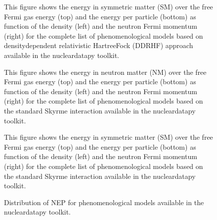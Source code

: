 \documentclass[letterpaper,10pt,english]{sphinxmanual}
\begin{document}
\begin{figure}[htbp]
\centering
\capstart

\noindent{}
\caption{This figure shows the energy in symmetric matter (SM) over the free Fermi gas energy (top) and the energy per particle (bottom) as function of the density (left) and the neutron Fermi momentum (right) for the complete list of phenomenological models based on density\sphinxhyphen{}dependent relativistic Hartree\sphinxhyphen{}Fock (DDRHF) approach available in the nucleardatapy toolkit.}\label{\detokenize{source/api/setup_eos_pheno:id6}}\end{figure}

\begin{figure}[htbp]
\centering
\capstart

\noindent{}
\caption{This figure shows the energy in neutron matter (NM) over the free Fermi gas energy (top) and the energy per particle (bottom) as function of the density (left) and the neutron Fermi momentum (right) for the complete list of phenomenological models based on the standard Skyrme interaction available in the nucleardatapy toolkit.}\label{\detokenize{source/api/setup_eos_pheno:id7}}\end{figure}

\begin{figure}[htbp]
\centering
\capstart

\noindent{}
\caption{This figure shows the energy in symmetric matter (SM) over the free Fermi gas energy (top) and the energy per particle (bottom) as function of the density (left) and the neutron Fermi momentum (right) for the complete list of phenomenological models based on the standard Skyrme interaction available in the nucleardatapy toolkit.}\label{\detokenize{source/api/setup_eos_pheno:id8}}\end{figure}

\begin{figure}[htbp]
\centering
\capstart

\noindent{}
\caption{Distribution of NEP for phenomenological models available in the nucleardatapy toolkit.}\label{\detokenize{source/api/setup_eos_pheno:id9}}\end{figure}

\sphinxstepscope
\end{document}
